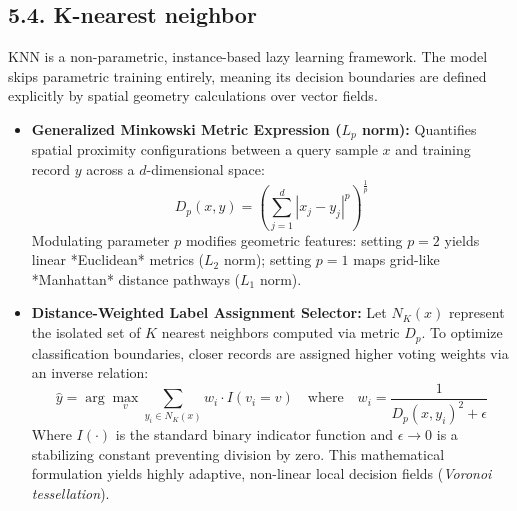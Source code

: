 \documentclass[../main.tex]{subfiles}
\begin{document}
\subsection{5.4. K-nearest neighbor}
KNN is a non-parametric, instance-based lazy learning framework. The model skips parametric training entirely, meaning its decision boundaries are defined explicitly by spatial geometry calculations over vector fields.
\begin{itemize}
    \item \textbf{Generalized Minkowski Metric Expression ($L_p$ norm):} Quantifies spatial proximity configurations between a query sample $x$ and training record $y$ across a $d$-dimensional space:
    \begin{equation}
        D_p(x, y) = \left( \sum_{j=1}^{d} |x_j - y_j|^p \right)^{\frac{1}{p}}
    \end{equation}
    Modulating parameter $p$ modifies geometric features: setting $p=2$ yields linear *Euclidean* metrics ($L_2$ norm); setting $p=1$ maps grid-like *Manhattan* distance pathways ($L_1$ norm).
    \item \textbf{Distance-Weighted Label Assignment Selector:} Let $N_K(x)$ represent the isolated set of $K$ nearest neighbors computed via metric $D_p$. To optimize classification boundaries, closer records are assigned higher voting weights via an inverse relation:
    \begin{equation}
        \hat{y} = \arg\max_{v} \sum_{y_i \in N_K(x)} w_i \cdot I(v_i = v) \quad \text{where} \quad w_i = \frac{1}{D_p(x, y_i)^2 + \epsilon}
    \end{equation}
    Where $I(\cdot)$ is the standard binary indicator function and $\epsilon \rightarrow 0$ is a stabilizing constant preventing division by zero. This mathematical formulation yields highly adaptive, non-linear local decision fields (\textit{Voronoi tessellation}).
\end{itemize}
\end{document}
